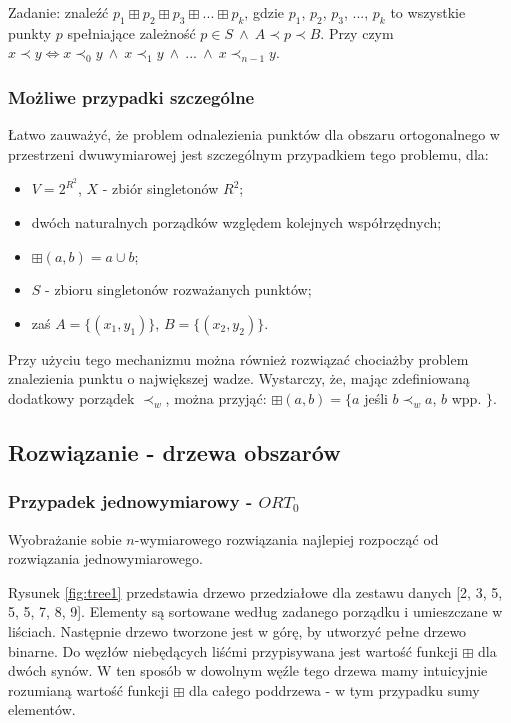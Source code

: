 \documentclass[a4paper]{article}
\begin{document}
Zadanie: znaleźć $p_1 \boxplus p_2 \boxplus p_3 \boxplus ...
 \boxplus p_k$, gdzie $p_1$, $p_2$, $p_3$, ..., $p_k$ to wszystkie punkty $p$ spełniające zależność $p \in S \ \land\ A \prec p \prec B$. Przy czym $x \prec y \iff x \prec_0 y \ \land\ x \prec_1 y \ \land\ ... \ \land\ x \prec_{n-1} y$.

\subsubsection*{Możliwe przypadki szczególne}
Łatwo zauważyć, że problem odnalezienia punktów dla obszaru ortogonalnego w przestrzeni dwuwymiarowej jest szczególnym przypadkiem tego problemu, dla:
\begin{itemize}[noitemsep,topsep=8pt]
\item $V = 2^{R^2}$, $X$ - zbiór singletonów $R^2$;
\item dwóch naturalnych porządków względem kolejnych współrzędnych;
\item $\boxplus(a, b) = a \cup b$;
\item $S$ - zbioru singletonów rozważanych punktów;
\item zaś $A = \{(x_1, y_1)\}$, $B = \{(x_2, y_2)\}$.
\end{itemize}

Przy użyciu tego mechanizmu można również rozwiązać chociażby problem znalezienia punktu o największej wadze. Wystarczy, że, mając zdefiniowaną dodatkowy porządek $\prec_w$, można przyjąć: $\boxplus(a, b) = \{a$ jeśli $b \prec_w a$, $b$ wpp. $\}$.

\subsection{Rozwiązanie - drzewa obszarów}
\subsubsection{Przypadek jednowymiarowy - $ORT_0$}
Wyobrażanie sobie $n$-wymiarowego rozwiązania najlepiej rozpocząć od rozwiązania jednowymiarowego.

Rysunek \ref{fig:tree1} przedstawia drzewo przedziałowe dla zestawu danych [2, 3, 5, 5, 5, 7, 8, 9]. Elementy są sortowane według zadanego porządku i umieszczane w liściach. Następnie drzewo tworzone jest w górę, by utworzyć pełne drzewo binarne. Do węzłów niebędących liśćmi przypisywana jest wartość funkcji $\boxplus$ dla dwóch synów. W ten sposób w dowolnym węźle tego drzewa mamy intuicyjnie rozumianą wartość funkcji $\boxplus$ dla całego poddrzewa - w tym przypadku sumy elementów.
\end{document}
